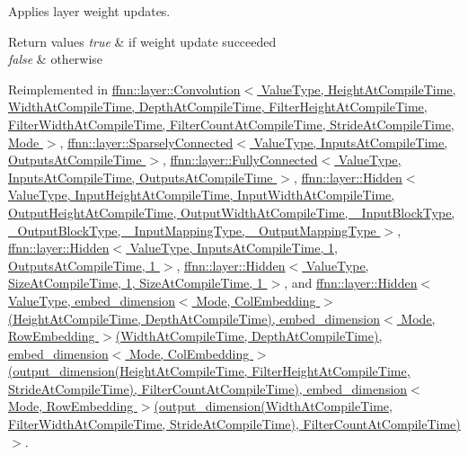 Applies layer weight updates. 


\begin{DoxyRetVals}{Return values}
{\em true} & if weight update succeeded \\
\hline
{\em false} & otherwise \\
\hline
\end{DoxyRetVals}


Reimplemented in \hyperlink{classffnn_1_1layer_1_1_convolution_a398b063c5e953e0cb21a827f139a2540}{ffnn\-::layer\-::\-Convolution$<$ Value\-Type, Height\-At\-Compile\-Time, Width\-At\-Compile\-Time, Depth\-At\-Compile\-Time, Filter\-Height\-At\-Compile\-Time, Filter\-Width\-At\-Compile\-Time, Filter\-Count\-At\-Compile\-Time, Stride\-At\-Compile\-Time, Mode $>$}, \hyperlink{classffnn_1_1layer_1_1_sparsely_connected_afa564d528e74917231da2d038f76e3f1}{ffnn\-::layer\-::\-Sparsely\-Connected$<$ Value\-Type, Inputs\-At\-Compile\-Time, Outputs\-At\-Compile\-Time $>$}, \hyperlink{classffnn_1_1layer_1_1_fully_connected_a3194dde96feea7d008cc0c27f30cc805}{ffnn\-::layer\-::\-Fully\-Connected$<$ Value\-Type, Inputs\-At\-Compile\-Time, Outputs\-At\-Compile\-Time $>$}, \hyperlink{classffnn_1_1layer_1_1_hidden_ace039624b0b202413e068fd523f26884}{ffnn\-::layer\-::\-Hidden$<$ Value\-Type, Input\-Height\-At\-Compile\-Time, Input\-Width\-At\-Compile\-Time, Output\-Height\-At\-Compile\-Time, Output\-Width\-At\-Compile\-Time, \-\_\-\-Input\-Block\-Type, \-\_\-\-Output\-Block\-Type, \-\_\-\-Input\-Mapping\-Type, \-\_\-\-Output\-Mapping\-Type $>$}, \hyperlink{classffnn_1_1layer_1_1_hidden_ace039624b0b202413e068fd523f26884}{ffnn\-::layer\-::\-Hidden$<$ Value\-Type, Inputs\-At\-Compile\-Time, 1, Outputs\-At\-Compile\-Time, 1 $>$}, \hyperlink{classffnn_1_1layer_1_1_hidden_ace039624b0b202413e068fd523f26884}{ffnn\-::layer\-::\-Hidden$<$ Value\-Type, Size\-At\-Compile\-Time, 1, Size\-At\-Compile\-Time, 1 $>$}, and \hyperlink{classffnn_1_1layer_1_1_hidden_ace039624b0b202413e068fd523f26884}{ffnn\-::layer\-::\-Hidden$<$ Value\-Type, embed\-\_\-dimension$<$ Mode, Col\-Embedding $>$(\-Height\-At\-Compile\-Time, Depth\-At\-Compile\-Time), embed\-\_\-dimension$<$ Mode, Row\-Embedding $>$(\-Width\-At\-Compile\-Time, Depth\-At\-Compile\-Time), embed\-\_\-dimension$<$ Mode, Col\-Embedding $>$(output\-\_\-dimension(\-Height\-At\-Compile\-Time, Filter\-Height\-At\-Compile\-Time, Stride\-At\-Compile\-Time), Filter\-Count\-At\-Compile\-Time), embed\-\_\-dimension$<$ Mode, Row\-Embedding $>$(output\-\_\-dimension(\-Width\-At\-Compile\-Time, Filter\-Width\-At\-Compile\-Time, Stride\-At\-Compile\-Time), Filter\-Count\-At\-Compile\-Time)$>$}.



